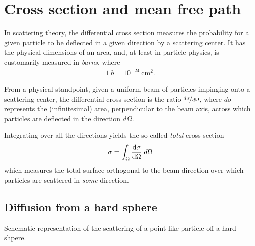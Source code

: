 \chapter{Cross section and mean free path}\label{chap:xsec}


In scattering theory, the differential cross section measures the probability for
a given particle to be deflected in a given direction by a scattering
center.
It has the physical dimensions of an area, and, at least in particle physics, is
customarily measured in \emph{barns}, where
\begin{align*}
  1~b = 10^{-24}~\text{cm}^2.
\end{align*}

From a physical standpoint, given a uniform beam of particles impinging onto a
scattering center, the differential cross section is the ratio $\nicefrac{d\sigma}{d\Omega}$,
where $d\sigma$ represents the (infinitesimal) area, perpendicular to the beam
axis, across which particles are deflected in the direction $d\Omega$.

Integrating over all the directions yields the so called \emph{total} cross section
\begin{align}
  \sigma = \int_\Omega \dv{\sigma}{\Omega} \;d{\Omega}
\end{align}
which measures the total surface orthogonal to the beam direction over which
particles are scattered in \emph{some} direction.


\section{Diffusion from a hard sphere}

\begin{marginfigure}
  
  \caption{Schematic representation of the scattering of a point-like particle
  off a hard shpere.}
  \label{fig:hard_sphere_xsec}
\end{marginfigure}

